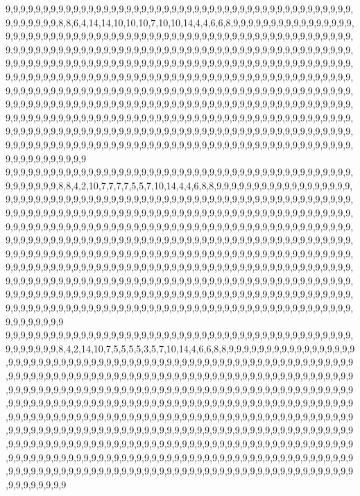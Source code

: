 9,9,9,9,9,9,9,9,9,9,9,9,9,9,9,9,9,9,9,9,9,9,9,9,9,9,9,9,9,9,9,9,9,9,9,9,9,9,9,9,9,9,9,9,9,9,9,9,9,9,9,9,9,8,8,6,4,14,14,10,10,10,7,10,10,14,4,4,6,6,8,9,9,9,9,9,9,9,9,9,9,9,9,9,9,9,9,9,9,9,9,9,9,9,9,9,9,9,9,9,9,9,9,9,9,9,9,9,9,9,9,9,9,9,9,9,9,9,9,9,9,9,9,9,9,9,9,9,9,9,9,9,9,9,9,9,9,9,9,9,9,9,9,9,9,9,9,9,9,9,9,9,9,9,9,9,9,9,9,9,9,9,9,9,9,9,9,9,9,9,9,9,9,9,9,9,9,9,9,9,9,9,9,9,9,9,9,9,9,9,9,9,9,9,9,9,9,9,9,9,9,9,9,9,9,9,9,9,9,9,9,9,9,9,9,9,9,9,9,9,9,9,9,9,9,9,9,9,9,9,9,9,9,9,9,9,9,9,9,9,9,9,9,9,9,9,9,9,9,9,9,9,9,9,9,9,9,9,9,9,9,9,9,9,9,9,9,9,9,9,9,9,9,9,9,9,9,9,9,9,9,9,9,9,9,9,9,9,9,9,9,9,9,9,9,9,9,9,9,9,9,9,9,9,9,9,9,9,9,9,9,9,9,9,9,9,9,9,9,9,9,9,9,9,9,9,9,9,9,9,9,9,9,9,9,9,9,9,9,9,9,9,9,9,9,9,9,9,9,9,9,9,9,9,9,9,9,9,9,9,9,9,9,9,9,9,9,9,9,9,9,9,9,9,9,9,9,9,9,9,9,9,9,9,9,9,9,9,9,9,9,9,9,9,9,9,9,9,9,9,9,9,9,9,9,9,9,9,9,9,9,9,9,9,9,9,9,9,9,9,9,9,9,9,9,9,9,9,9,9,9,9,9,9,9,9,9,9,9,9,9,9,9,9,9,9,9,9,9,9,9,9,9,9,9,9,9,9,9,9,9,9,9,9,9,9,9,9,9,9,9,9,9,9,9,9,9,9,9,9,9,9,9,9,9,9,9,9,9,9,9,9,9,9,9,9,9,9,9,9,9,9,9,9,9,9,9,9,9,9,9,9
9,9,9,9,9,9,9,9,9,9,9,9,9,9,9,9,9,9,9,9,9,9,9,9,9,9,9,9,9,9,9,9,9,9,9,9,9,9,9,9,9,9,9,9,9,9,9,9,9,9,9,9,9,8,8,4,2,10,7,7,7,7,5,5,7,10,14,4,4,6,8,8,9,9,9,9,9,9,9,9,9,9,9,9,9,9,9,9,9,9,9,9,9,9,9,9,9,9,9,9,9,9,9,9,9,9,9,9,9,9,9,9,9,9,9,9,9,9,9,9,9,9,9,9,9,9,9,9,9,9,9,9,9,9,9,9,9,9,9,9,9,9,9,9,9,9,9,9,9,9,9,9,9,9,9,9,9,9,9,9,9,9,9,9,9,9,9,9,9,9,9,9,9,9,9,9,9,9,9,9,9,9,9,9,9,9,9,9,9,9,9,9,9,9,9,9,9,9,9,9,9,9,9,9,9,9,9,9,9,9,9,9,9,9,9,9,9,9,9,9,9,9,9,9,9,9,9,9,9,9,9,9,9,9,9,9,9,9,9,9,9,9,9,9,9,9,9,9,9,9,9,9,9,9,9,9,9,9,9,9,9,9,9,9,9,9,9,9,9,9,9,9,9,9,9,9,9,9,9,9,9,9,9,9,9,9,9,9,9,9,9,9,9,9,9,9,9,9,9,9,9,9,9,9,9,9,9,9,9,9,9,9,9,9,9,9,9,9,9,9,9,9,9,9,9,9,9,9,9,9,9,9,9,9,9,9,9,9,9,9,9,9,9,9,9,9,9,9,9,9,9,9,9,9,9,9,9,9,9,9,9,9,9,9,9,9,9,9,9,9,9,9,9,9,9,9,9,9,9,9,9,9,9,9,9,9,9,9,9,9,9,9,9,9,9,9,9,9,9,9,9,9,9,9,9,9,9,9,9,9,9,9,9,9,9,9,9,9,9,9,9,9,9,9,9,9,9,9,9,9,9,9,9,9,9,9,9,9,9,9,9,9,9,9,9,9,9,9,9,9,9,9,9,9,9,9,9,9,9,9,9,9,9,9,9,9,9,9,9,9,9,9,9,9,9,9,9,9,9,9,9,9,9,9,9,9,9,9,9,9,9,9,9,9,9,9,9,9,9,9,9,9,9,9,9,9,9,9,9,9,9,9
9,9,9,9,9,9,9,9,9,9,9,9,9,9,9,9,9,9,9,9,9,9,9,9,9,9,9,9,9,9,9,9,9,9,9,9,9,9,9,9,9,9,9,9,9,9,9,9,9,9,9,9,9,8,4,2,14,10,7,5,5,5,5,3,5,7,10,14,4,6,6,8,8,9,9,9,9,9,9,9,9,9,9,9,9,9,9,9,9,9,9,9,9,9,9,9,9,9,9,9,9,9,9,9,9,9,9,9,9,9,9,9,9,9,9,9,9,9,9,9,9,9,9,9,9,9,9,9,9,9,9,9,9,9,9,9,9,9,9,9,9,9,9,9,9,9,9,9,9,9,9,9,9,9,9,9,9,9,9,9,9,9,9,9,9,9,9,9,9,9,9,9,9,9,9,9,9,9,9,9,9,9,9,9,9,9,9,9,9,9,9,9,9,9,9,9,9,9,9,9,9,9,9,9,9,9,9,9,9,9,9,9,9,9,9,9,9,9,9,9,9,9,9,9,9,9,9,9,9,9,9,9,9,9,9,9,9,9,9,9,9,9,9,9,9,9,9,9,9,9,9,9,9,9,9,9,9,9,9,9,9,9,9,9,9,9,9,9,9,9,9,9,9,9,9,9,9,9,9,9,9,9,9,9,9,9,9,9,9,9,9,9,9,9,9,9,9,9,9,9,9,9,9,9,9,9,9,9,9,9,9,9,9,9,9,9,9,9,9,9,9,9,9,9,9,9,9,9,9,9,9,9,9,9,9,9,9,9,9,9,9,9,9,9,9,9,9,9,9,9,9,9,9,9,9,9,9,9,9,9,9,9,9,9,9,9,9,9,9,9,9,9,9,9,9,9,9,9,9,9,9,9,9,9,9,9,9,9,9,9,9,9,9,9,9,9,9,9,9,9,9,9,9,9,9,9,9,9,9,9,9,9,9,9,9,9,9,9,9,9,9,9,9,9,9,9,9,9,9,9,9,9,9,9,9,9,9,9,9,9,9,9,9,9,9,9,9,9,9,9,9,9,9,9,9,9,9,9,9,9,9,9,9,9,9,9,9,9,9,9,9,9,9,9,9,9,9,9,9,9,9,9,9,9,9,9,9,9,9,9,9,9,9,9,9,9,9,9,9,9,9,9,9,9,9,9,9,9,9,9,9,9
